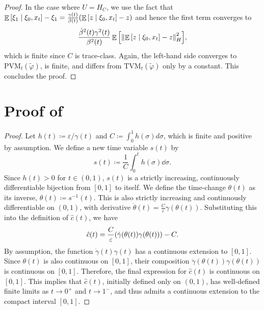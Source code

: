 \begin{proof}
  In the case where \(U = H_{C}\), we use the fact that \(\mathop{\mathbb{E}}\qty[\xi_{1} \mid \xi_{0}, x_{t}] - \xi_{1} = \frac{\gamma(t)}{\beta(t)}\qty(\mathop{\mathbb{E}}\qty[z \mid \xi_{0}, x_{t}] - z)\) and hence the first term converges to
  \[
    \frac{\dot{\beta}^{2}(t) \gamma^{2}(t)}{\beta^{2}(t)} \mathop{\mathbb{E}}\qty[\norm{\mathop{\mathbb{E}}\qty[z \mid \xi_{0}, x_{t}] - z}^{2}_{H}],
  \]
  which is finite since \(C\) is trace-class. Again, the left-hand side converges to \(\mathrm{PVM}_{t}(\widetilde{\varphi})\), is finite, and differs from \(\mathrm{TVM}_{t}(\widetilde{\varphi})\) only by a constant. This concludes the proof.
\end{proof}

\section{Proof of } \label{prf:lem:tc}
\restatelemtc*
\begin{proof}
  Let \(h(t) \coloneqq \varepsilon/\gamma(t)\) and \(C \coloneqq \int_0^1 h(\sigma) d\sigma\), which is finite and positive by assumption. We define a new time variable \(s(t)\) by
  \[ s(t) \coloneqq \frac{1}{C} \int_{0}^{t} h(\sigma) \dd{\sigma}. \]
  Since \(h(t) > 0\) for \(t \in (0, 1)\), \(s(t)\) is a strictly increasing, continuously differentiable bijection from \([0, 1]\) to itself. We define the time-change \(\theta(t)\) as its inverse, \(\theta(t) \coloneqq s^{-1}(t)\). This is also strictly increasing and continuously differentiable on \((0, 1)\), with derivative \(
  \dot{\theta}(t) = \frac{C}{\varepsilon} \gamma(\theta(t))\).
  Substituting this into the definition of \(\hat{c}(t)\), we have
  \[
    \hat{c}(t) = \frac{C}{\varepsilon} \qty(\dot{\gamma}(\theta(t)) \gamma(\theta(t))) - C.
  \]
  By assumption, the function \(\dot{\gamma}(t)\gamma(t)\) has a continuous extension to \([0, 1]\). Since \(\theta(t)\) is also continuous on \([0, 1]\), their composition \(\dot{\gamma}(\theta(t))\gamma(\theta(t))\) is continuous on \([0, 1]\). Therefore, the final expression for \(\hat{c}(t)\) is continuous on \([0, 1]\). This implies that \(\hat{c}(t)\), initially defined only on \((0, 1)\), has well-defined finite limits as \(t \to 0^{+}\) and \(t \to 1^{-}\), and thus admits a continuous extension to the compact interval \([0, 1]\).
\end{proof}

